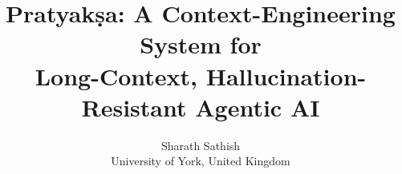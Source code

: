 \documentclass[10pt]{article}
\begin{document}
\title{\vspace{-2.0em}\Large\bfseries Pratyak\d{s}a: A Context-Engineering System for\\
Long-Context, Hallucination-Resistant Agentic AI}
\author{Sharath Sathish\\[2pt]
\normalsize University of York, United Kingdom}
\date{}
\maketitle\thispagestyle{empty}
















\clearpage
\appendix









\clearpage

\end{document}
